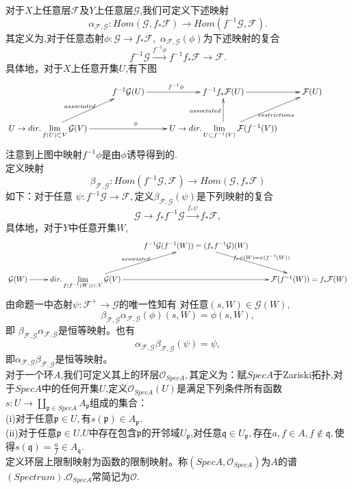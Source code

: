 \documentclass[UTF8]{article}
\begin{document}
对于$X$上任意层$\mathcal{F}$及$Y$上任意层$\mathcal{G}$,我们可定义下述映射
$$
\alpha_{\mathcal{F},\mathcal{G}}:Hom(\mathcal{G},f_{*}\mathcal{F})\rightarrow Hom(f^{-1}\mathcal{G},\mathcal{F}).
$$
其定义为,对于任意态射$\phi:\mathcal{G}\rightarrow f_{*}\mathcal{F},$ $\alpha_{\mathcal{F},\mathcal{G}}(\phi)$为下述映射的复合
$$f^{-1}\mathcal{G} \stackrel{f^{-1}\phi}{\longrightarrow}
f^{-1}f_{*}\mathcal{F}\rightarrow\mathcal{F}.
$$
具体地，对于$X$上任意开集$U$,有下图
$$
\xymatrix{
  &f^{-1}\mathcal{G}(U)\ar[r]^{f^{-1}\phi}& f^{-1}f_{*}\mathcal{F}(U) \ar[r]&\mathcal{F}(U)\\
    U\rightarrow dir.\lim\limits_{f(U)\subset V}\mathcal{G}(V)\ar[rr]^{\phi}\ar[ru]^{associated}& &U\rightarrow dir.\lim\limits_{U\subset f^{-1}(V)}\mathcal{F}(f^{-1}(V))\ar[ur]_{restrictions}\ar[u]^{associated}& & 
}
$$
注意到上图中映射$f^{-1}\phi$是由$\phi$诱导得到的.\\
定义映射
$$\beta_{\mathcal{F},\mathcal{G}}:Hom(f^{-1}\mathcal{G},\mathcal{F})\rightarrow Hom(\mathcal{G},f_{*}\mathcal{F})$$
如下：对于任意
$\psi:f^{-1}\mathcal{G}\rightarrow \mathcal{F},$定义$\beta_{\mathcal{F},\mathcal{G}}(\psi)$是下列映射的复合
$$
\mathcal{G}\rightarrow f_{*}f^{-1}\mathcal{G}\stackrel{f_{*}\psi}{\longrightarrow}f_{*}\mathcal{F},
$$
具体地，对于$Y$中任意开集$W$,
$$
\xymatrix{
	& & f^{-1}\mathcal{G}(f^{-1}(W))=(f_{*}f^{-1}\mathcal{G})(W)\ar[dr]^{f_{*}\psi(W)=\psi(f^{-1}(W))} &\\
\mathcal{G}(W)\ar[r] &dir.\lim\limits_{f(f^{-1}(W))\subset V}\mathcal{G}(V)\ar[ur]^{associated}\ar[rr]&&\mathcal{F}(f^{-1}(W))=f_{*}\mathcal{F}(W)
}
$$
由命题一中态射$\psi:\mathcal{F}^{+}\rightarrow \mathcal{G}$的唯一性知有 
对任意$(s,W)\in \mathcal{G}(W),$
$$\beta_{\mathcal{F},\mathcal{G}}\alpha_{\mathcal{F},\mathcal{G}}(\phi)(s,W)=\phi(s,W),$$即
$\beta_{\mathcal{F},\mathcal{G}}\alpha_{\mathcal{F},\mathcal{G}}$是恒等映射。也有
$$\alpha_{\mathcal{F},\mathcal{G}}\beta_{\mathcal{F},\mathcal{G}}(\psi)=\psi,$$
即$\alpha_{\mathcal{F},\mathcal{G}}\beta_{\mathcal{F},\mathcal{G}}$是恒等映射。\\

对于一个环$A$,我们可定义其上的环层$\mathcal{O}_{SpecA},$其定义为：赋$SpecA$于Zariski拓扑,对于$SpecA$中的任何开集$U$,定义$\mathcal{O}_{SpecA}(U)$是满足下列条件所有函数$s:U\rightarrow \coprod_{\mathfrak{p}\in SpecA}A_{\mathfrak{p}}$组成的集合：\\
(i)对于任意$\mathfrak{p}\in U,$有$s(\mathfrak{p})\in A_{\mathfrak{p}}.$\\
(ii)对于任意$\mathfrak{p}\in U$.$U$中存在包含$\mathfrak{p}$的开邻域$U_{\mathfrak{p}}$,对任意$\mathfrak{q}\in U_{\mathfrak{p}},$存在$a,f\in A,f\notin \mathfrak{q},$使得$s(\mathfrak{q})=\frac{a}{f}\in A_{\mathfrak{q}}.$\\
定义环层上限制映射为函数的限制映射。称$(SpecA,\mathcal{O}_{SpecA})$为$A$的谱$(Spectrum).$$\mathcal{O}
_{SpecA}$常简记为$\mathcal{O}$.\\
\end{document}
